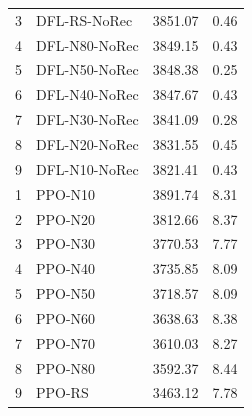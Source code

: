 \begin{table}[h]
\begin{tabular}{clcc}
3 & DFL-RS-NoRec & 3851.07 & 0.46 \\
4 & DFL-N80-NoRec & 3849.15 & 0.43 \\
5 & DFL-N50-NoRec & 3848.38 & 0.25 \\
6 & DFL-N40-NoRec & 3847.67 & 0.43 \\
7 & DFL-N30-NoRec & 3841.09 & 0.28 \\
8 & DFL-N20-NoRec & 3831.55 & 0.45 \\
9 & DFL-N10-NoRec & 3821.41 & 0.43 \\
\midrule
1 & PPO-N10 & 3891.74 & 8.31 \\
2 & PPO-N20 & 3812.66 & 8.37 \\
3 & PPO-N30 & 3770.53 & 7.77 \\
4 & PPO-N40 & 3735.85 & 8.09 \\
5 & PPO-N50 & 3718.57 & 8.09 \\
6 & PPO-N60 & 3638.63 & 8.38 \\
7 & PPO-N70 & 3610.03 & 8.27 \\
8 & PPO-N80 & 3592.37 & 8.44 \\
9 & PPO-RS & 3463.12 & 7.78 \\
\bottomrule
\end{tabular}
\end{table}

